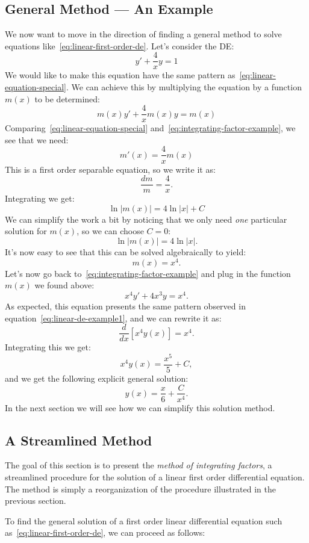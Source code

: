 \documentclass{ximera}
\begin{document}
\subsection*{General Method --- An Example}
 
We now want to move in the direction of finding a general method to solve equations like~\ref{eq:linear-first-order-de}. Let's consider the DE:
\[
y'+\frac{4}{x}y=1
\]
We would like to make this equation have the same pattern as~\ref{eq:linear-equation-special}. We can achieve this by multiplying the equation by a function $m(x)$ to be determined:
\begin{equation}
\label{eq:integrating-factor-example}
m(x)y'+\frac{4}{x}m(x)y=m(x)
\end{equation}
Comparing~\ref{eq:linear-equation-special} and~\ref{eq:integrating-factor-example}, we see that we need:
\[
m'(x)=\frac{4}{x}m(x)
\]
This is a first order separable equation, so we write it as:
\[
\frac{dm}{m}=\frac{4}{x}.
\]
Integrating we get:
\[
\ln|m(x)|=4\ln|x|+C
\]
We can simplify the work a bit by noticing that we only need \emph{one} particular solution for $m(x)$, so we can choose $C=0$:
\[
\ln|m(x)|=4\ln|x|.
\]
It's now easy to see that this can be solved algebraically to yield:
\[
m(x)=x^4.
\]
Let's now go back to~\ref{eq:integrating-factor-example} and plug in the function $m(x)$ we found above:
\[
x^4y'+4x^3y=x^4.
\]
As expected, this equation presents the same pattern observed in equation~\ref{eq:linear-de-example1}, and we can rewrite it as:
\[
\frac{d}{dx}\left[x^4y(x)\right] = x^4.
\]
Integrating this we get:
\[
x^4y(x)=\frac{x^5}{5}+C,
\]
and we get the following explicit general solution:
\[
y(x)=\frac{x}{6}+\frac{C}{x^4}.
\]
In the next section we will see how we can simplify this solution method.
 
\subsection*{A Streamlined Method}
 
The goal of this section is to present the \textit{method of integrating factors}, a streamlined procedure for the solution of a linear first order differential equation. The method is simply a reorganization of the procedure illustrated in the previous section.
 
To find the general solution of a first order linear differential equation such as~\ref{eq:linear-first-order-de}, we can proceed as follows:
 
\end{document}

